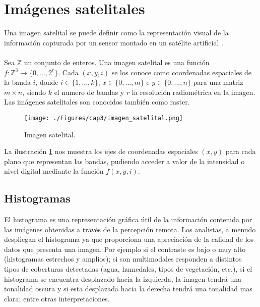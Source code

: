 \section{Im\'agenes satelitales}

Una imagen satelital se puede definir como la representaci\'on visual de la informaci\'on capturada por un sensor montado en un sat\'elite artificial \cite{acosta2003experiencia}. \\~\\
Sea $ \mathbb{Z} $ un conjunto de enteros. Una imagen satelital es una funci\'on $ f:\mathbb{Z}^{3} \longrightarrow \{0,...,2^{r}\} $. Cada $ (x,y,i) $ se los conoce como coordenadas espaciales de la banda $ i $, donde $ i \in \{1,...,k\} $, $ x \in \{0,...,m\} $ e $ y \in \{0,...,n\} $ para una matriz $ m \times n $, siendo $ k $ el numero de bandas y $ r $ la resoluci\'on radiom\'etrica en la imagen. Las im\'agenes satelitales son conocidos tambi\'en como raster.
  \begin{figure}[H]
  	\centering
  	\texttt{[image: ./Figures/cap3/imagen\_satelital.png]}
  	\caption{Imagen satelital.}
  	\label{fig:imagenMultiespectral}
  \end{figure}
La ilustraci\'on \ref{fig:imagenMultiespectral} nos muestra los ejes de coordenadas espaciales $ (x,y) $ para cada plano que representan las bandas, pudiendo acceder a valor de la intensidad o nivel digital mediante la funci\'on $ f(x,y,i) $.


\subsection{Histogramas}
El histograma es una representaci\'on gr\'afica \'util de la informaci\'on contenida por las im\'agenes obtenidas a trav\'es de la percepci\'on remota. Los analistas, a menudo despliegan el histograma ya que proporciona una apreciaci\'on de la calidad de los datos que presenta una imagen. Por ejemplo si el contraste es bajo o muy alto (histogramas estrechos y amplios); si son multimodales responden a distintos tipos de coberturas detectadas (agua, humedales, tipos de vegetaci\'on, etc.), si el histograma se encuentra desplazado hacia la izquierda, la imagen tendr\'a una tonalidad oscura y si esta desplazada hacia la derecha tendr\'a una tonalidad mas clara; entre otras interpretaciones.

